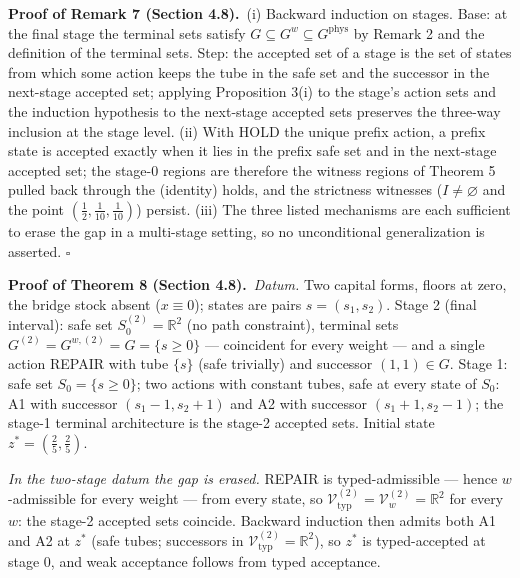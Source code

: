 \documentclass[3p,11pt]{elsarticle}
\begin{document}
\textbf{Proof of Remark 7 (Section 4.8).}\ (i) Backward induction on stages. Base: at the final stage
the terminal sets satisfy
\(G \subseteq G^w \subseteq G^{\mathrm{phys}}\) by Remark 2 and the
definition of the terminal sets. Step: the accepted set of a stage is
the set of states from which some action keeps the tube in the safe set
and the successor in the next-stage accepted set; applying Proposition
3(i) to the stage's action sets and the induction hypothesis to the
next-stage accepted sets preserves the three-way inclusion at the stage
level. (ii) With HOLD the unique prefix action, a prefix state is
accepted exactly when it lies in the prefix safe set and in the
next-stage accepted set; the stage-0 regions are therefore the witness
regions of Theorem 5 pulled back through the (identity) holds, and the
strictness witnesses (\(I \neq \varnothing\) and the point
\((\tfrac12, \tfrac1{10}, \tfrac1{10})\)) persist. (iii) The three
listed mechanisms are each sufficient to erase the gap in a multi-stage
setting, so no unconditional generalization is asserted. \ensuremath{\square}

\textbf{Proof of Theorem 8 (Section 4.8).}\ \emph{Datum.} Two capital forms, floors at zero, the bridge stock absent
(\(x \equiv 0\)); states are pairs \(s = (s_1, s_2)\). Stage 2 (final
interval): safe set \(S_0^{(2)} = \mathbb{R}^2\) (no path constraint),
terminal sets \(G^{(2)} = G^{w,(2)} = G = \{ s \ge 0 \}\) --- coincident
for every weight --- and a single action REPAIR with tube \(\{s\}\)
(safe trivially) and successor \((1, 1) \in G\). Stage 1: safe set
\(S_0 = \{ s \ge 0 \}\); two actions with constant tubes, safe at every
state of \(S_0\): A1 with successor \((s_1 - 1, s_2 + 1)\) and A2 with
successor \((s_1 + 1, s_2 - 1)\); the stage-1 terminal architecture is
the stage-2 accepted sets. Initial state \(z^* = (\tfrac25, \tfrac25)\).

\emph{In the two-stage datum the gap is erased.} REPAIR is
typed-admissible --- hence \(w\)-admissible for every weight --- from
every state, so
\(\mathcal{V}_{\mathrm{typ}}^{(2)} = \mathcal{V}_w^{(2)} = \mathbb{R}^2\)
for every \(w\): the stage-2 accepted sets coincide. Backward induction
then admits both A1 and A2 at \(z^*\) (safe tubes; successors in
\(\mathcal{V}_{\mathrm{typ}}^{(2)} = \mathbb{R}^2\)), so \(z^*\) is
typed-accepted at stage 0, and weak acceptance follows from typed
acceptance.
\end{document}
